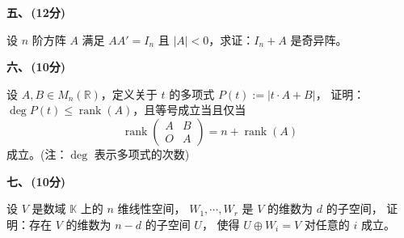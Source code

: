 \textbf{五、\,(12分)}

设 $n$ 阶方阵 $A$ 满足 $A A' = I_n$ 且 $|A| < 0$，求证：$I_n + A$ 是奇异阵。

\textbf{六、\,(10分)}

设 $A, B \in M_n(\mathbb{R})$，定义关于 $t$ 的多项式 $P(t) := |t \cdot A + B|$，
证明：$\deg P(t) \leq \operatorname{rank}(A)$，且等号成立当且仅当
\[
\operatorname{rank} \begin{pmatrix}
    A & B \\
    O & A
\end{pmatrix} = n + \operatorname{rank}(A)
\]
成立。(注：$\deg$ 表示多项式的次数)

\textbf{七、\,(10分)}

设 $V$ 是数域 $\mathbb{K}$ 上的 $n$ 维线性空间，
$W_1, \cdots, W_r$ 是 $V$ 的维数为 $d$ 的子空间，
证明：存在 $V$ 的维数为 $n-d$ 的子空间 $U$，
使得 $U \oplus W_i = V$ 对任意的 $i$ 成立。



